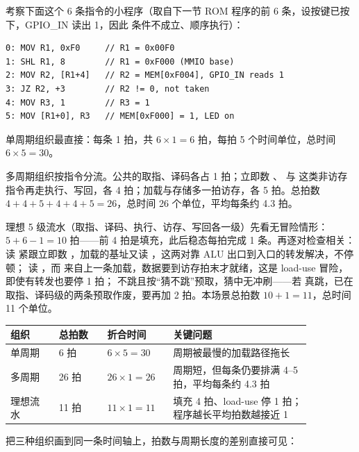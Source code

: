 考察下面这个 6 条指令的小程序（取自下一节 ROM 程序的前 6 条，设按键已按下，GPIO\_IN 读出 1，因此  条件不成立、顺序执行）：

\begin{lstlisting}
0: MOV R1, 0xF0     // R1 = 0x00F0
1: SHL R1, 8        // R1 = 0xF000 (MMIO base)
2: MOV R2, [R1+4]   // R2 = MEM[0xF004], GPIO_IN reads 1
3: JZ R2, +3        // R2 != 0, not taken
4: MOV R3, 1        // R3 = 1
5: MOV [R1+0], R3   // MEM[0xF000] = 1, LED on
\end{lstlisting}

单周期组织最直接：每条 1 拍，共 $6\times1=6$ 拍，每拍 5 个时间单位，总时间 $6\times5=30$。

多周期组织按指令分流。公共的取指、译码各占 1 拍；立即数 、 与  这类非访存指令再走执行、写回，各 4 拍；加载与存储多一拍访存，各 5 拍。总拍数 $4+4+5+4+4+5=26$，总时间 26 个单位，平均每条约 4.3 拍。

理想 5 级流水（取指、译码、执行、访存、写回各一级）先看无冒险情形：$5+6-1=10$ 拍——前 4 拍是填充，此后稳态每拍完成 1 条。再逐对检查相关： 读  紧跟立即数 ，加载的基址又读 ，这两对靠 ALU 出口到入口的转发解决，不停顿； 读 ，而  来自上一条加载，数据要到访存拍末才就绪，这是 load-use 冒险，即使有转发也要停 1 拍； 不跳且按“猜不跳”预取，猜中无冲刷——若  真跳，已在取指、译码级的两条预取作废，要再加 2 拍。本场景总拍数 $10+1=11$，总时间 11 个单位。

\begin{longtable}{L{0.14\linewidth}L{0.14\linewidth}L{0.18\linewidth}L{0.4\linewidth}}
\toprule
组织 & 总拍数 & 折合时间 & 关键问题 \\
\midrule
单周期 & 6 拍 & $6\times5=30$ & 周期被最慢的加载路径拖长 \\
多周期 & 26 拍 & $26\times1=26$ & 周期短，但每条仍要排满 4–5 拍，平均每条约 4.3 拍 \\
理想流水 & 11 拍 & $11\times1=11$ & 填充 4 拍、load-use 停 1 拍；程序越长平均拍数越接近 1 \\
\bottomrule
\end{longtable}

把三种组织画到同一条时间轴上，拍数与周期长度的差别直接可见：

